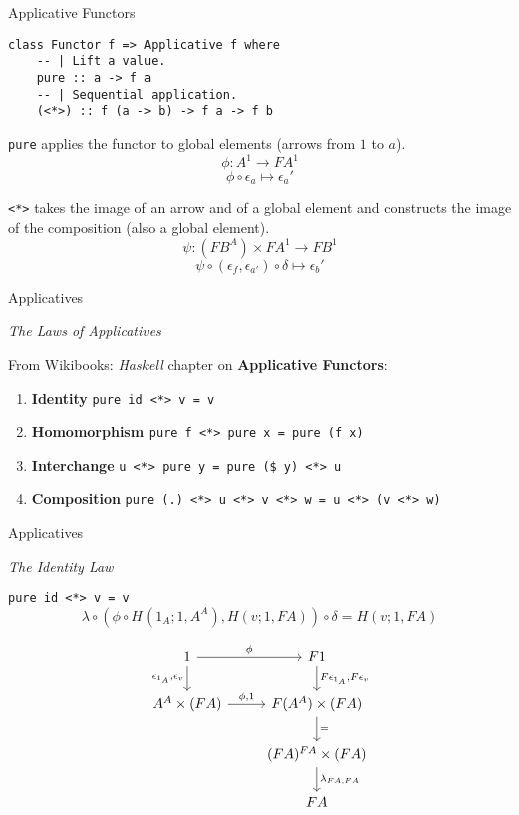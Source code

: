 \documentclass[10pt]{beamer}
\newcommand{\Com}[3]{#3^{#2}}
\newcommand{\strong}[1]{\textbf{#1}}
\theoremstyle{definition}
\theoremstyle{remark}
\numberwithin{equation}{section}
\begin{document}
\begin{frame}[fragile]{Applicative Functors}

  \begin{lstlisting}[frame=single]
class Functor f => Applicative f where
    -- | Lift a value.
    pure :: a -> f a
    -- | Sequential application.
    (<*>) :: f (a -> b) -> f a -> f b
  \end{lstlisting}

  \lstinline{pure} applies the functor to global elements (arrows from $1$ to $a$).
  \[
  \phi : \Com{Hask}{1}{A} \rightarrow \Com{Hask}{1}{F A}
  \]
  \[
  \phi \circ \epsilon_a \mapsto \epsilon_a'
  \]

  \lstinline{<*>} takes the image of an arrow and of a global element and constructs the image of the composition (also a global element).
  \[
  \psi : (F \Com{Hask}{A}{B})\times\Com{Hask}{1}{F A} \rightarrow \Com{Hask}{1}{F B}
  \]
  \[
  \psi \circ (\epsilon_{f},\epsilon_{a'}) \circ \delta \mapsto \epsilon_b'
  \]

\end{frame}

\begin{frame}[fragile]{Applicatives}

  \emph{The Laws of Applicatives}

  From Wikibooks: \emph{Haskell} chapter on \strong{Applicative Functors}:
  
  \begin{enumerate}
  \item \strong{Identity}     \lstinline{pure id <*> v = v}
  \item \strong{Homomorphism} \lstinline{pure f <*> pure x = pure (f x)}
  \item \strong{Interchange}  \lstinline{u <*> pure y = pure ($ y) <*> u}
  \item \strong{Composition}  \lstinline{pure (.) <*> u <*> v <*> w = u <*> (v <*> w)}
  \end{enumerate}

\end{frame}

\begin{frame}[fragile]{Applicatives}

  \emph{The Identity Law}

  \lstinline{pure id <*> v = v}
  \[
  \lambda \circ (\phi \circ H(1_A;1,A^A),H(v;1,F A)) \circ \delta = H(v;1,F A)
  \]

  \[
  \begin{tikzcd}
    1 \arrow{r}{\phi}\arrow{d}[swap]{\epsilon_{1_A},\epsilon_v} & F 1 \arrow{d}{F \epsilon_{1_A},F \epsilon_v} \\
    \Com{C}{A}{A}\times (F A) \arrow{r}{\phi,1} & F (\Com{C}{A}{A}) \times (F A) \arrow{d}{=} \\
    & \Com{C}{F A}{(F A)} \times (F A) \arrow{d}{\lambda_{FA,FA}} \\
    & F A
  \end{tikzcd}
  \]

\end{frame}
\end{document}

